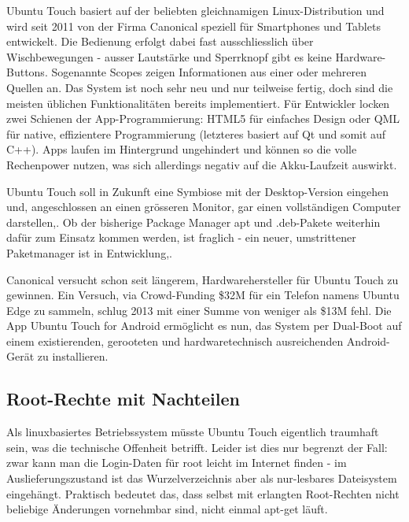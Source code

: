 Ubuntu Touch basiert auf der beliebten gleichnamigen Linux-Distribution und wird seit 2011 von der Firma Canonical speziell für Smartphones und Tablets entwickelt\thinspace\cite{online:ubuntutouch-features}. Die Bedienung erfolgt dabei fast ausschliesslich über Wischbewegungen - ausser Lautstärke und Sperrknopf gibt es keine Hardware-Buttons\thinspace\cite{online:ubuntutouch-blick}. Sogenannte Scopes zeigen Informationen aus einer oder mehreren Quellen an\thinspace\cite{online:ubuntutouch-scopes}. Das System ist noch sehr neu und nur teilweise fertig, doch sind die meisten üblichen Funktionalitäten bereits implementiert\thinspace\cite{online:ubuntutouch-blick}. Für Entwickler locken zwei Schienen der App-Programmierung: HTML5 für einfaches Design oder QML für native, effizientere Programmierung (letzteres basiert auf Qt und somit auf C++)\thinspace\cite{online:ubuntutouch-developers}. Apps laufen im Hintergrund ungehindert und können so die volle Rechenpower nutzen, was sich allerdings negativ auf die Akku-Laufzeit auswirkt\thinspace\cite{online:ubuntutouch-blick}.

Ubuntu Touch soll in Zukunft eine Symbiose mit der Desktop-Version eingehen und, angeschlossen an einen grösseren Monitor, gar einen vollständigen Computer darstellen\thinspace\cite{online:ubuntutouch-advantages},\thinspace\cite{online:ubuntutouch-edge}. Ob der bisherige Package Manager apt und .deb-Pakete weiterhin dafür zum Einsatz kommen werden, ist fraglich - ein neuer, umstrittener Paketmanager ist in Entwicklung\thinspace\cite{online:ubuntutouch-snappy},\thinspace\cite{online:ubuntutouch-snappytalk}.

Canonical versucht schon seit längerem, Hardwarehersteller für Ubuntu Touch zu gewinnen. Ein Versuch, via Crowd-Funding \$32M für ein Telefon namens Ubuntu Edge zu sammeln\thinspace\cite{online:ubuntutouch-edge}, schlug 2013 mit einer Summe von weniger als \$13M fehl\thinspace\cite{online:ubuntutouch-edgefail}. Die App Ubuntu Touch for Android ermöglicht es nun, das System per Dual-Boot auf einem existierenden, gerooteten und hardwaretechnisch ausreichenden Android-Gerät zu installieren.\\

\subsection{Root-Rechte mit Nachteilen}
Als linuxbasiertes Betriebssystem müsste Ubuntu Touch eigentlich traumhaft sein, was die technische Offenheit betrifft. Leider ist dies nur begrenzt der Fall: zwar kann man die Login-Daten für root leicht im Internet finden - im Auslieferungszustand ist das Wurzelverzeichnis aber als nur-lesbares Dateisystem eingehängt. Praktisch bedeutet das, dass selbst mit erlangten Root-Rechten nicht beliebige Änderungen vornehmbar sind, nicht einmal apt-get läuft\thinspace\cite{online:ubuntutouch-aptget}.


